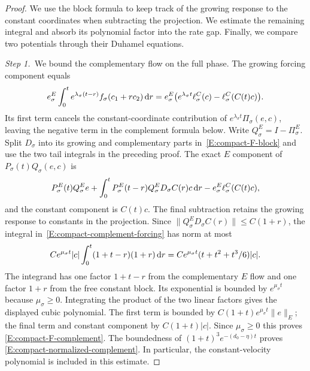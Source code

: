 \begin{proof}
  We use the block formula to keep track of the growing response to the
  constant coordinates when subtracting the projection. We estimate the
  remaining integral and absorb its polynomial factor into the rate gap.
  Finally, we compare two potentials through their Duhamel equations.

  \medskip
  \noindent\textit{Step 1.~}We bound the complementary flow on the full phase.
  The growing forcing component equals
  \[
    e_\sigma^E\int_0^t e^{\lambda_\sigma(t-r)}
    f_\sigma(c_1+rc_2)\,\mathrm{d} r
    =e_\sigma^E\bigl(e^{\lambda_\sigma t}\ell_\sigma^C(c)
    -\ell_\sigma^C(C(t)c)\bigr).
  \]
  Its first term cancels the constant-coordinate contribution of
  $e^{\lambda_\sigma t}\Pi_\sigma(e,c)$, leaving the negative term in the
  complement formula below.
  Write $Q_\sigma^E = I-\Pi_\sigma^E$. Split $D_\sigma$ into its growing and
  complementary parts in~\eqref{E:compact-F-block} and use the two tail
  integrals in the preceding proof. The exact $E$ component of
  $P_\sigma(t)Q_\sigma(e,c)$ is
  \begin{equation}\label{E:compact-complement-forcing}
    P_\sigma^E(t)Q_\sigma^Ee
    +\int_0^tP_\sigma^E(t-r)Q_\sigma^ED_\sigma C(r)c\,\mathrm{d} r
    -e_\sigma^E\ell_\sigma^C(C(t)c),
  \end{equation}
  and the constant component is $C(t)c$. The final subtraction retains the
  growing response to constants in the projection. Since $\|Q_\sigma^ED_\sigma
  C(r)\| \le C(1+r)$, the integral in~\eqref{E:compact-complement-forcing} has
  norm at most
  \[
    Ce^{\mu_\sigma t}|c|
    \int_0^t(1+t-r)(1+r)\,\mathrm{d} r
    =Ce^{\mu_\sigma t}(t+t^2+t^3/6)|c|.
  \]
  The integrand has one factor $1+t-r$ from the complementary $E$ flow and one
  factor $1+r$ from the free constant block. Its exponential is bounded by
  $e^{\mu_\sigma t}$ because $\mu_\sigma \ge 0$. Integrating the product of
  the two linear factors gives the displayed cubic polynomial.
  The first term is bounded by $C(1+t)e^{\mu_\sigma t}\|e\|_E$; the final term
  and constant component by $C(1+t)|c|$. Since $\mu_\sigma \ge 0$ this proves
  \eqref{E:compact-F-complement}. The boundedness of $(1+t)^3e^{-(d_0-\eta)t}$
  proves \eqref{E:compact-normalized-complement}. In particular, the
  constant-velocity polynomial is included in this estimate.



\end{proof}
